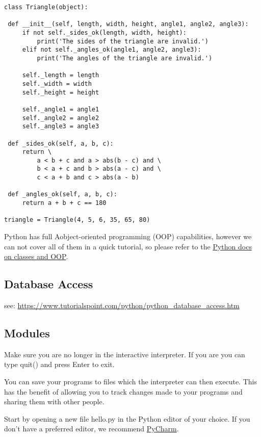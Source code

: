 \begin{verbatim}
class Triangle(object):

 def __init__(self, length, width, height, angle1, angle2, angle3):
     if not self._sides_ok(length, width, height):
         print('The sides of the triangle are invalid.')
     elif not self._angles_ok(angle1, angle2, angle3):
         print('The angles of the triangle are invalid.')

     self._length = length
     self._width = width
     self._height = height

     self._angle1 = angle1
     self._angle2 = angle2
     self._angle3 = angle3

 def _sides_ok(self, a, b, c):
     return \
         a < b + c and a > abs(b - c) and \
         b < a + c and b > abs(a - c) and \
         c < a + b and c > abs(a - b)

 def _angles_ok(self, a, b, c):
     return a + b + c == 180

triangle = Triangle(4, 5, 6, 35, 65, 80)
\end{verbatim}

Python has full Aobject-oriented programming (OOP) capabilities, however
we can not cover all of them in a quick tutorial, so please refer to the
\href{https://docs.python.org/2.7/tutorial/classes.html}{Python docs on
classes and OOP}.

\subsection{Database Access}\label{database-access}

see:
\url{https://www.tutorialspoint.com/python/python_database_access.htm}

\subsection{Modules}\label{modules}

Make sure you are no longer in the interactive interpreter. If you are
you can type quit() and press Enter to exit.

You can save your programs to files which the interpreter can then
execute. This has the benefit of allowing you to track changes made to
your programs and sharing them with other people.

Start by opening a new file hello.py in the Python editor of your
choice. If you don't have a preferred editor, we recommend
\href{https://www.jetbrains.com/pycharm/}{PyCharm}.

